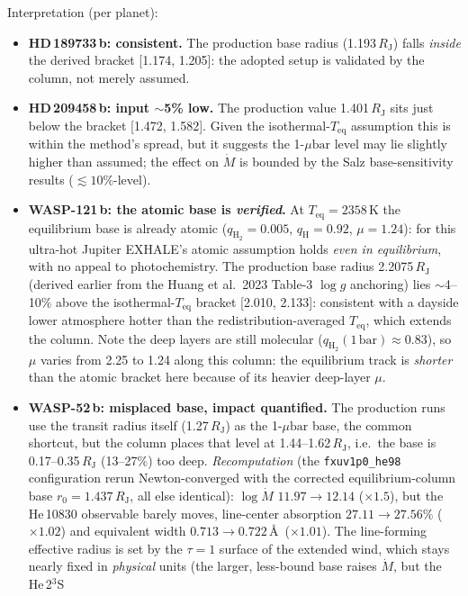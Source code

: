 \documentclass[english,a4paper]{my_memo}
\newcommand{\RJ}{R_{\mathrm{J}}}
\newcommand{\Mdot}{\dot{M}}
\newcommand{\ubar}{\mu\mathrm{bar}}
\newcommand{\qHH}{q_{\mathrm{H_2}}}
\begin{document}
\noindent Interpretation (per planet):
\begin{itemize}
\item \textbf{HD\,189733\,b: consistent.} The production base radius (1.193\,$\RJ$)
  falls \emph{inside} the derived bracket [1.174, 1.205]: the adopted setup is validated
  by the column, not merely assumed.
\item \textbf{HD\,209458\,b: input $\sim$5\% low.} The production value 1.401\,$\RJ$
  sits just below the bracket [1.472, 1.582]. Given the isothermal-$T_\mathrm{eq}$
  assumption this is within the method's spread, but it suggests the 1-$\ubar$ level may
  lie slightly higher than assumed; the effect on $\Mdot$ is bounded by the Salz
  base-sensitivity results ($\lesssim10\%$-level).
\item \textbf{WASP-121\,b: the atomic base is \emph{verified}.} At
  $T_\mathrm{eq}=2358$\,K the equilibrium base is already atomic ($\qHH=0.005$,
  $q_\mathrm{H}=0.92$, $\mu=1.24$): for this ultra-hot Jupiter EXHALE's atomic assumption
  holds \emph{even in equilibrium}, with no appeal to photochemistry. The production base
  radius 2.2075\,$\RJ$ (derived earlier from the Huang et al.\ 2023 Table-3 $\log g$
  anchoring) lies $\sim$4--10\% above the isothermal-$T_\mathrm{eq}$ bracket [2.010,
  2.133]: consistent with a dayside lower atmosphere hotter than the
  redistribution-averaged $T_\mathrm{eq}$, which extends the column. Note the deep layers
  are still molecular ($\qHH(1\,\mathrm{bar})\approx0.83$), so $\mu$ varies from 2.25 to
  1.24 along this column: the equilibrium track is \emph{shorter} than the atomic
  bracket here because of its heavier deep-layer $\mu$.
\item \textbf{WASP-52\,b: misplaced base, impact quantified.} The production runs use
  the transit radius itself (1.27\,$\RJ$) as the 1-$\ubar$ base, the common shortcut,
  but the column places that level at 1.44--1.62\,$\RJ$, i.e.\ the base is
  0.17--0.35\,$\RJ$ (13--27\%) too deep. \emph{Recomputation} (the
  \texttt{fxuv1p0\_he98} configuration rerun Newton-converged with the corrected
  equilibrium-column base $r_0=1.437\,\RJ$, all else identical): $\log\Mdot$
  $11.97\to12.14$ ($\times1.5$), but the He\,10830 observable barely moves,
  line-center absorption $27.11\to27.56\%$ ($\times1.02$) and equivalent width
  $0.713\to0.722$\,\AA\ ($\times1.01$). The line-forming effective radius is set by
  the $\tau{=}1$ surface of the extended wind, which stays nearly fixed in
  \emph{physical} units (the larger, less-bound base raises $\Mdot$, but the He\,2$^3$S

\end{itemize}
\end{document}
